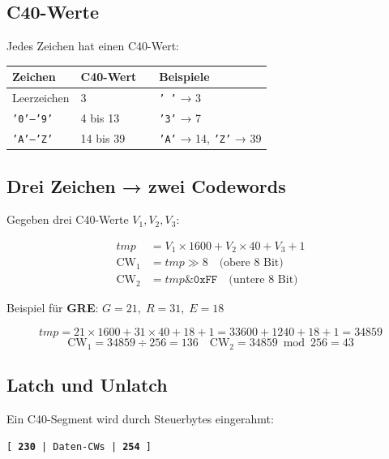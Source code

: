 \subsection*{C40-Werte}

Jedes Zeichen hat einen C40-Wert:

\begin{center}
\begin{tabular}{llll}
\hline
\textbf{Zeichen} & \textbf{C40-Wert} & \quad &
\textbf{Beispiele} \\
\hline
Leerzeichen      & 3                 & & \texttt{' '} → 3 \\
\texttt{'0'–'9'} & 4 bis 13          & & \texttt{'3'} → 7 \\
\texttt{'A'–'Z'} & 14 bis 39         & & \texttt{'A'} → 14, \texttt{'Z'} → 39 \\
\hline
\end{tabular}
\end{center}

\subsection*{Drei Zeichen → zwei Codewords}

Gegeben drei C40-Werte $V_1, V_2, V_3$:

\begin{align*}
  \mathit{tmp}    &= V_1 \times 1600 + V_2 \times 40 + V_3 + 1 \\
  \text{CW}_1 &= \mathit{tmp} \gg 8 \quad\text{(obere 8~Bit)} \\
  \text{CW}_2 &= \mathit{tmp} \mathbin{\&} \texttt{0xFF} \quad\text{(untere 8~Bit)}
\end{align*}

Beispiel für \textbf{GRE}:
$G=21,\; R=31,\; E=18$

\[
  \mathit{tmp} = 21 \times 1600 + 31 \times 40 + 18 + 1
              = 33600 + 1240 + 18 + 1 = 34859
\]
\[
  \text{CW}_1 = 34859 \div 256 = 136 \quad
  \text{CW}_2 = 34859 \bmod 256 = 43
\]

\subsection*{Latch und Unlatch}

Ein C40-Segment wird durch Steuerbytes eingerahmt:

\begin{center}
\texttt{[\,\textbf{230}\,|\; Daten-CWs \;|\,\textbf{254}\,]}
\end{center}

